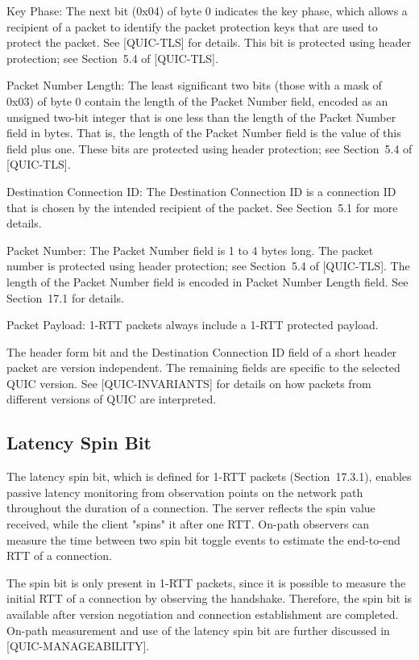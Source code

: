 \documentclass{article}
\begin{document}
Key Phase:  The next bit (0x04) of byte 0 indicates the key phase, which allows a recipient of a packet to identify the packet protection keys that are used to protect the packet.  See [QUIC-TLS] for details.  This bit is protected using header protection; see Section~5.4 of [QUIC-TLS].

Packet Number Length:  The least significant two bits (those with a mask of 0x03) of byte 0 contain the length of the Packet Number field, encoded as an unsigned two-bit integer that is one less than the length of the Packet Number field in bytes.  That is, the length of the Packet Number field is the value of this field plus one.  These bits are protected using header protection; see Section~5.4 of [QUIC-TLS].

Destination Connection ID:  The Destination Connection ID is a connection ID that is chosen by the intended recipient of the packet.  See Section~5.1 for more details.

Packet Number:  The Packet Number field is 1 to 4 bytes long.  The packet number is protected using header protection; see Section~5.4 of [QUIC-TLS].  The length of the Packet Number field is encoded in Packet Number Length field.  See Section~17.1 for details.

Packet Payload:  1-RTT packets always include a 1-RTT protected payload.

The header form bit and the Destination Connection ID field of a short header packet are version independent.  The remaining fields are specific to the selected QUIC version.  See [QUIC-INVARIANTS] for details on how packets from different versions of QUIC are interpreted.

\subsection{Latency Spin Bit}

The latency spin bit, which is defined for 1-RTT packets (Section~17.3.1), enables passive latency monitoring from observation points on the network path throughout the duration of a connection. The server reflects the spin value received, while the client "spins" it after one RTT.  On-path observers can measure the time between two spin bit toggle events to estimate the end-to-end RTT of a connection.

The spin bit is only present in 1-RTT packets, since it is possible to measure the initial RTT of a connection by observing the handshake.  Therefore, the spin bit is available after version negotiation and connection establishment are completed.  On-path measurement and use of the latency spin bit are further discussed in [QUIC-MANAGEABILITY].
\end{document}
